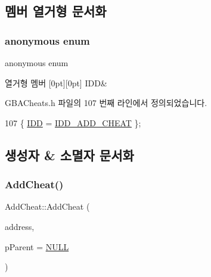 \subsection{멤버 열거형 문서화}
\mbox{\label{class_add_cheat_af696833b823db49de5667fcb42b11a26}} 
\subsubsection{\texorpdfstring{anonymous enum}{anonymous enum}}
{\footnotesize\ttfamily anonymous enum}

\begin{DoxyEnumFields}{열거형 멤버}
[0pt][0pt]{}\mbox{\label{class_add_cheat_af696833b823db49de5667fcb42b11a26afedef0c6962fabc2ac997728fd544a12}} 
I\+DD&\\
\hline

\end{DoxyEnumFields}


G\+B\+A\+Cheats.\+h 파일의 107 번째 라인에서 정의되었습니다.


\begin{DoxyCode}
107 \{ \mbox{\hyperlink{class_add_cheat_af696833b823db49de5667fcb42b11a26afedef0c6962fabc2ac997728fd544a12}{IDD}} = \mbox{\hyperlink{resource_8h_ad4208f6eab3496843a3a8f652140f45b}{IDD\_ADD\_CHEAT}} \};
\end{DoxyCode}


\subsection{생성자 \& 소멸자 문서화}
\mbox{\label{class_add_cheat_afa75eefc22d2f9449cf3b9283926408c}} 
\subsubsection{\texorpdfstring{Add\+Cheat()}{AddCheat()}}
{\footnotesize\ttfamily Add\+Cheat\+::\+Add\+Cheat (\begin{DoxyParamCaption}\item[{\mbox{\hyperlink{_system_8h_a10e94b422ef0c20dcdec20d31a1f5049}{u32}}}]{address,  }\item[{C\+Wnd $\ast$}]{p\+Parent = {\ttfamily \mbox{\hyperlink{_system_8h_a070d2ce7b6bb7e5c05602aa8c308d0c4}{N\+U\+LL}}} }\end{DoxyParamCaption})}



